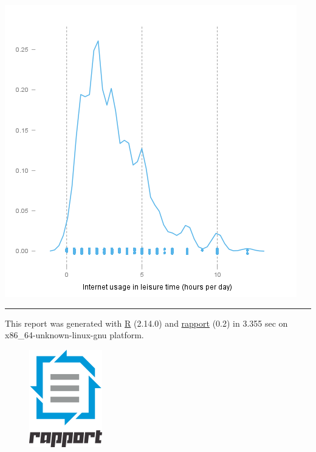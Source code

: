 \documentclass[]{article}
\makeatletter
\def\maxwidth{\ifdim\Gin@nat@width>\linewidth\linewidth
\else\Gin@nat@width\fi}
\let\Oldincludegraphics\includegraphics
\renewcommand{\includegraphics}[1]{\Oldincludegraphics[width=\maxwidth]{#1}}
\makeatother
\begin{document}
\href{73a741791c399acd94fdfb544c213fb4-hires.png}{\includegraphics{73a741791c399acd94fdfb544c213fb4.png}}

\begin{center}\rule{3in}{0.4pt}\end{center}

This report was generated with \href{http://www.r-project.org/}{R}
(2.14.0) and \href{http://al3xa.github.com/rapport/}{rapport} (0.2) in
3.355 sec on x86\_64-unknown-linux-gnu platform.

\begin{figure}[htbp]
\centering
\includegraphics{images/logo.png}
\caption{}
\end{figure}
\end{document}

